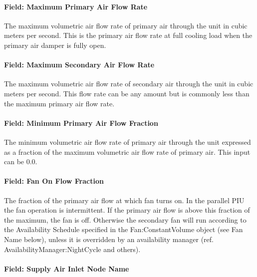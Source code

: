 \paragraph{Field: Maximum Primary Air Flow Rate}\label{field-maximum-primary-air-flow-rate-1}

The maximum volumetric air flow rate of primary air through the unit in cubic meters per second. This is the primary air flow rate at full cooling load when the primary air damper is fully open.

\paragraph{Field: Maximum Secondary Air Flow Rate}\label{field-maximum-secondary-air-flow-rate}

The maximum volumetric air flow rate of secondary air through the unit in cubic meters per second. This flow rate can be any amount but is commonly less than the maximum primary air flow rate.

\paragraph{Field: Minimum Primary Air Flow Fraction}\label{field-minimum-primary-air-flow-fraction-1}

The minimum volumetric air flow rate of primary air through the unit expressed as a fraction of the maximum volumetric air flow rate of primary air. This input can be 0.0.

\paragraph{Field: Fan On Flow Fraction}\label{field-fan-on-flow-fraction}

The fraction of the primary air flow at which fan turns on. In the parallel PIU the fan operation is intermittent. If the primary air flow is above this fraction of the maximum, the fan is off. Otherwise the secondary fan will run according to the Availability Schedule specified in the Fan:ConstantVolume object (see Fan Name below), unless it is overridden by an availability manager (ref. AvailabilityManager:NightCycle and others).

\paragraph{Field: Supply Air Inlet Node Name}\label{field-supply-air-inlet-node-name-1}

